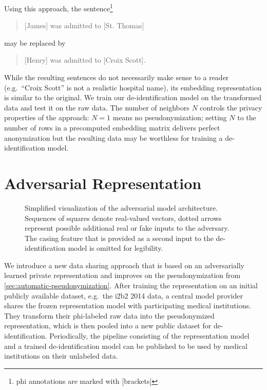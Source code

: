 %
Using this approach, the sentence\footnote{\ac{phi} annotations are marked with [brackets]}
%
\begin{quote}
    [James] was admitted to [St. Thomas]
\end{quote}
%
may be replaced by
\begin{quote}
    [Henry] was admitted to [Croix Scott].
\end{quote}
%
While the resulting sentences do not necessarily make sense to a reader (e.g.\ ``Croix Scott'' is not a realistic hospital name), its embedding representation is similar to the original.
%
We train our de-identification model on the transformed data and test it on the raw data.
%
The number of neighbors $N$ controls the privacy properties of the approach: $N = 1$ means no pseudonymization; setting $N$ to the number of rows in a precomputed embedding matrix delivers perfect anonymization but the resulting data may be worthless for training a de-identification model.

\section{Adversarial Representation}\label{sec:adversarial-representation}

\begin{figure}
    \centering
    
    \caption[Adversarial model architecture]{%
        Simplified visualization of the adversarial model architecture.
        Sequences of squares denote real-valued vectors, dotted arrows represent possible additional real or fake inputs to the adversary.
        The casing feature that is provided as a second input to the de-identification model is omitted for legibility.}\label{fig:adversarial-model}
\end{figure}

%
We introduce a new data sharing approach that is based on an adversarially learned private representation and improves on the pseudonymization from \cref{sec:automatic-pseudonymization}.
%
After training the representation on an initial publicly available dataset, e.g.\ the i2b2 2014 data, a central model provider shares the frozen representation model with participating medical institutions.
%
They transform their \ac{phi}-labeled raw data into the pseudonymized representation, which is then pooled into a new public dataset for de-identification.
%
Periodically, the pipeline consisting of the representation model and a trained de-identification model can be published to be used by medical institutions on their unlabeled data.

